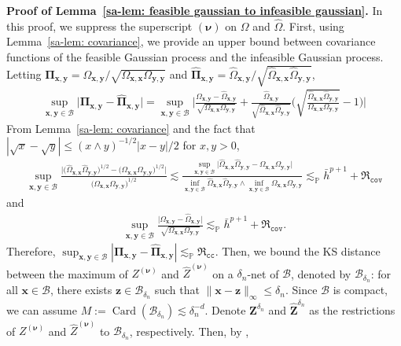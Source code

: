 \documentclass[10pt]{article}
\newcommand{\infnorm}[1]{\lVert #1 \rVert_{\infty}}
\newcommand{\lessp}{\lesssim_{\mathbb{P}}}
\newcommand{\bx}{\mathbf{x}}
\newcommand{\by}{\mathbf{y}}
\newcommand{\bz}{\mathbf{z}}
\newcommand{\bZ}{\mathbf{Z}}
\newcommand{\bnu}{\boldsymbol{\nu}}
\newcommand{\bPi}{\boldsymbol{\Pi}}
\newcommand{\B}{\mathcal{B}}
\begin{document}
\noindent \textbf{Proof of Lemma~\ref{sa-lem: feasible gaussian to infeasible gaussian}.} In this proof, we suppress the superscript $(\bnu)$ on $\Omega$ and $\widehat{\Omega}$. First, using Lemma~\ref{sa-lem: covariance}, we provide an upper bound between covariance functions of the feasible Gaussian process and the infeasible Gaussian process. Letting $\bPi_{\bx, \by} = \Omega_{\bx, \by} / \sqrt{\Omega_{\bx,\bx} \Omega_{\by,\by}}$ and $\widehat{\bPi}_{\bx,\by} = \widehat{\Omega}_{\bx,\by} / \sqrt{\widehat{\Omega}_{\bx,\bx} \widehat{\Omega}_{\by,\by}}$,
\begin{align*}
    \sup_{\bx,\by \in \B} \big|\bPi_{\bx, \by} - \widehat{\bPi}_{\bx,\by}\big|
    = \sup_{\bx, \by \in \B}
      \Big|\frac{\Omega_{\bx, \by} - \widehat{\Omega}_{\bx, \by}}{\sqrt{\Omega_{\bx,\bx} \Omega_{\by,\by}}}
         + \frac{\widehat{\Omega}_{\bx, \by}}{\sqrt{\widehat{\Omega}_{\bx,\bx} \widehat{\Omega}_{\by,\by}}} \Big(\sqrt{\frac{\widehat{\Omega}_{\bx,\bx} \widehat{\Omega}_{\by,\by}}{\Omega_{\bx,\bx} \Omega_{\by,\by}}} - 1\Big)\Big|
\end{align*}
From Lemma~\ref{sa-lem: covariance} and the fact that $|\sqrt{x} - \sqrt{y}| \leq (x \wedge y)^{-1/2} |x - y|/2$ for $x, y > 0$,
\begin{align*}
    \sup_{\bx,\by \in \B}
    \frac{\big|\big(\widehat{\Omega}_{\bx,\bx} \widehat{\Omega}_{\by,\by}\big)^{1/2} - \big(\Omega_{\bx,\bx} \Omega_{\by,\by}\big)^{1/2}\big|}
         {\big(\Omega_{\bx,\bx} \Omega_{\by,\by}\big)^{1/2}}
    \lesssim \frac{\sup_{\bx, \by \in \B} \big|\widehat{\Omega}_{\bx,\bx} \widehat{\Omega}_{\by,\by}  - \Omega_{\bx,\bx} \Omega_{\by,\by}\big|}
                  {\inf_{\bx,\by\in\B} \widehat{\Omega}_{\bx,\bx} \widehat{\Omega}_{\by,\by} \wedge \inf_{\bx,\by\in\B} \Omega_{\bx,\bx} \Omega_{\by,\by}}
    \lessp \bar{h}^{p+1} + \mathfrak{R}_{\mathtt{cov}}
\end{align*}
and
\begin{align*}
    \sup_{\bx, \by \in \B} \frac{\big|\Omega_{\bx,\by} - \widehat{\Omega}_{\bx,\by}\big|}{\sqrt{\Omega_{\bx,\bx} \Omega_{\by,\by}}}
    \lessp \bar{h}^{p+1} + \mathfrak{R}_{\mathtt{cov}}.
\end{align*}
Therefore, $\sup_{\bx, \by \in \B} |\bPi_{\bx, \by} - \widehat{\bPi}_{\bx,\by}| \lessp \mathfrak{R}_{\mathtt{cc}}$. Then, we bound the KS distance between the maximum of $Z^{(\bnu)}$ and $\widehat{Z}^{(\bnu)}$ on a $\delta_n$-net of $\B$, denoted by $\B_{\delta_n}$: for all $\bx \in \B$, there exists $\bz \in \B_{\delta_n}$ such that $\infnorm{\bx - \bz} \leq \delta_n$. Since $\B$ is compact, we can assume $M := \operatorname{Card}\left(\B_{\delta_n}\right) \lesssim \delta_n^{-d}$. Denote $\bZ^{\delta_n}$ and $\widehat{\bZ}^{\delta_n}$ as the restrictions of $Z^{(\bnu)}$ and $\widehat{Z}^{(\bnu)}$ to $\B_{\delta_n}$, respectively. Then, by \citet[Theorem 2.1]{Chernozhukov-Chetverikov-Kato-Koike_2022_AoS},
\end{document}
